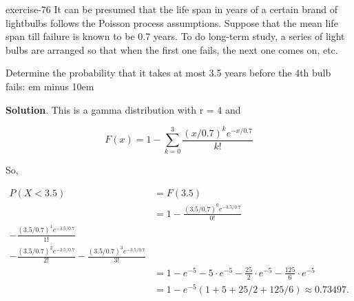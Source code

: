 \documentclass[10pt,]{book}
\newcommand{\fillin}[1]{\leavevmode\leaders\vrule height -1.2pt depth 1.5pt \hskip #1em minus #1em \null}
\numberwithin{equation}{section}
\newcommand{\lt}{<}
\newcommand{\amp}{&}
\begin{document}
\begin{inlineexercise}{}{exercise-76}%
\hypertarget{p-1128}{}%
It can be presumed that the life span in years of a certain brand of lightbulbs follows the Poisson process assumptions.  Suppose that the mean life span till failure is known to be 0.7 years. To do long-term study, a series of light bulbs are arranged so that when the first one fails, the next one comes on, etc.%
\par
\hypertarget{p-1129}{}%
Determine the probability that it takes at most 3.5 years before the 4th bulb fails:  \fillin{10}%
\par\smallskip%
\noindent\textbf{Solution}.\hypertarget{solution-37}{}\quad%
\hypertarget{p-1130}{}%
This is a gamma distribution with r = 4 and%
\par
\hypertarget{p-1131}{}%
%
\begin{equation*}
F(x) = 1 - \sum_{k=0}^3 \frac{ (x/0.7)^k e^{-x/0.7}}{k!}
\end{equation*}
%
\par
\hypertarget{p-1132}{}%
So,%
\par
\hypertarget{p-1133}{}%
%
\begin{equation*}
\begin{aligned}
P(X \lt 3.5) \amp  = F(3.5)\\
\amp  = 1 - \frac{ (3.5/0.7)^0 e^{-3.5/0.7}}{0!} \\ - \frac{ (3.5/0.7)^1 e^{-3.5/0.7}}{1!} \\ - \frac{ (3.5/0.7)^2 e^{-3.5/0.7}}{2!} - \frac{ (3.5/0.7)^3 e^{-3.5/0.7}}{3!}\\
\amp  = 1 - e^{-5} - 5 \cdot e^{-5} - \frac{25}{2} \cdot e^{-5} - \frac{125}{6} \cdot e^{-5}\\
\amp  = 1 - e^{-5} \left ( 1 + 5 + 25/2 + 125/6 \right ) \approx 0.73497.
\end{aligned}
\end{equation*}
%
\end{inlineexercise}
%
\par
\hypertarget{p-1134}{}%
\end{document}
